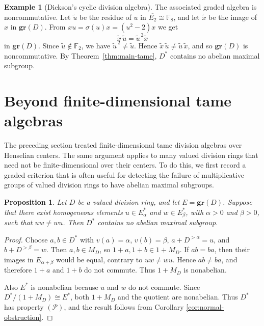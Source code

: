 \documentclass[11pt]{amsart}
\newtheorem{proposition}[theorem]{Proposition}
\theoremstyle{definition}
\newtheorem{example}[theorem]{Example}
\begin{document}
\begin{example}[Dickson's cyclic division algebra]
The associated graded algebra is noncommutative.  Let $\widetilde u$ be the residue of $u$ in $\overline{E_2}\cong\mathbb F_8$, and let $\widetilde x$ be the image of $x$ in $\mathbf{gr}(D)$.  From $xu=\sigma(u)x=(u^2-2)x$ we get
\[
        \widetilde x\,\widetilde u
        =
        \widetilde u^{\,2}\widetilde x
\]
in $\mathbf{gr}(D)$.  Since $\widetilde u\notin\mathbb F_2$, we have $\widetilde u^{\,2}\ne\widetilde u$.  Hence $\widetilde x\,\widetilde u\ne\widetilde u\,\widetilde x$, and so $\mathbf{gr}(D)$ is noncommutative.  By Theorem~\ref{thm:main-tame}, $D^*$ contains no abelian maximal subgroup.
\end{example}

\section{Beyond finite-dimensional tame algebras}
\label{sec:beyond-tame}

The preceding section treated finite-dimensional tame division algebras over Henselian centers.  The same argument applies to many valued division rings that need not be finite-dimensional over their centers.  To do this, we first record a graded criterion that is often useful for detecting the
failure of multiplicative groups of valued division rings to have abelian
maximal subgroups.

\begin{proposition}
\label{prop:positive-positive-graded}
Let $D$ be a valued division ring, and let $E=\mathbf{gr}(D)$. Suppose that
there exist homogeneous elements $u\in E_\alpha^*$ and $w\in E_\beta^*$,
with $\alpha>0$ and $\beta>0$, such that $uw\ne wu$. Then $D^*$ contains no
abelian maximal subgroup.
\end{proposition}

\begin{proof}
Choose $a,b\in D^*$ with $v(a)=\alpha$, $v(b)=\beta$,
$a+D^{>\alpha}=u$, and $b+D^{>\beta}=w$. Then $a,b\in M_D$, so
$1+a,1+b\in 1+M_D$. If $ab=ba$, then their images in
$E_{\alpha+\beta}$ would be equal, contrary to $uw\ne wu$. Hence
$ab\ne ba$, and therefore $1+a$ and $1+b$ do not commute. Thus $1+M_D$ is
nonabelian.

Also $E^*$ is nonabelian because $u$ and $w$ do not commute. Since
$D^*/(1+M_D)\cong E^*$, both $1+M_D$ and the quotient are nonabelian.
Thus $D^*$ has property $(\mathcal P)$, and the result follows from
Corollary \ref{cor:normal-obstruction}.
\end{proof}
\end{document}
